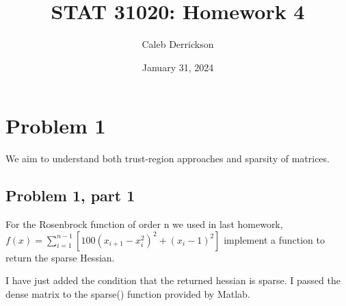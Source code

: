 



\title{STAT 31020: Homework 4}
\author{Caleb Derrickson}
\date{January 31, 2024}


\onehalfspacing
\maketitle
\allowdisplaybreaks
\tableofcontents

\newpage
\section{Problem 1}
We aim to understand both trust-region approaches and sparsity of matrices. 
\subsection{Problem 1, part 1}
For the Rosenbrock function of order n we used in last homework,\\
$f(x) = \sum_{i = 1}^{n - 1} \left[ 100 (x_{i+1} - x_i^2)^2 + (x_i - 1)^2\right]$
implement a function to return the sparse Hessian.
\partbreak
\begin{solution}

    I have just added the condition that the returned hessian is sparse. I passed the dense matrix to the sparse() function provided by Matlab.
\end{solution}

\newpage
